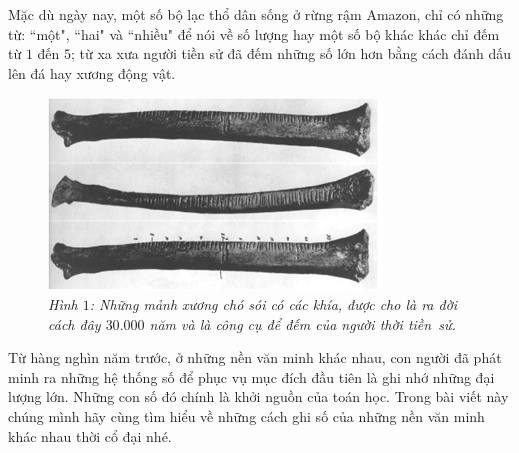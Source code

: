 \begin{multicols}{2}
		Mặc dù ngày nay, một số bộ lạc thổ dân sống ở rừng rậm Amazon, chỉ có những từ: ``một", ``hai" và ``nhiều" để nói về số lượng hay một số bộ khác khác chỉ đếm từ $1$ đến $5$; từ xa xưa người tiền sử đã đếm những số lớn hơn bằng cách đánh dấu lên đá hay xương động vật.
	\vskip 0.1cm
	\begin{figure}[H]
		\centering
		\vspace*{-5pt}
		\captionsetup{labelformat= empty, justification=centering}
		\includegraphics[width=1\linewidth]{1}
		\caption{\textit{\color{toancuabi}Hình $1$: Những mảnh xương chó sói có các khía, được cho là ra đời cách đây $30{.}000$ năm và là công cụ để đếm của người thời tiền~sử.}}
		\vspace*{-10pt}
	\end{figure}
	Từ hàng nghìn năm trước, ở những nền văn minh khác nhau, con người đã phát minh ra những hệ thống số để phục vụ mục đích đầu tiên là ghi nhớ những đại lượng lớn. Những con số đó chính là khởi nguồn của toán học. Trong bài viết này chúng mình hãy cùng tìm hiểu về những cách ghi số của những nền văn minh khác nhau thời cổ đại nhé.
	\begin{figure}[H]
		\centering
		\vspace*{-5pt}
		\captionsetup{labelformat= empty, justification=centering}
\end{figure}
\end{multicols}
